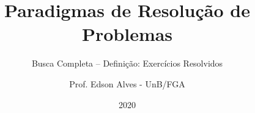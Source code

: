 \title{Paradigmas de Resolução de Problemas}
\subtitle{Busca Completa -- Definição: Exercícios Resolvidos}
\author{Prof. Edson Alves - UnB/FGA}
\date{2020}
